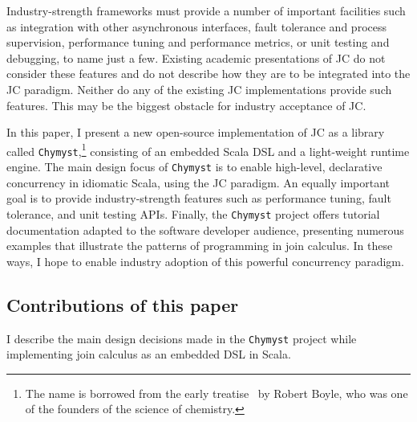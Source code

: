 \documentclass[sigplan,10pt,review,anonymous]{acmart}\settopmatter{printfolios=true}
\begin{document}
Industry-strength frameworks must provide a number of important facilities
such as integration with other asynchronous interfaces, fault tolerance
and process supervision, performance tuning and performance metrics,
or unit testing and debugging, to name just a few. Existing academic
presentations of JC do not consider these features and do not describe
how they are to be integrated into the JC paradigm. Neither do any
of the existing JC implementations provide such features. This may
be the biggest obstacle for industry acceptance of JC.

In this paper, I present a new open-source implementation of JC as
a library called \texttt{Chymyst},\footnote{ The name is borrowed from the early treatise~\citep{Boy1661} by
Robert Boyle, who was one of the founders of the science of chemistry.} consisting of an embedded Scala DSL and a light-weight runtime engine.
The main design focus of \texttt{Chymyst} is to enable high-level,
declarative concurrency in idiomatic Scala, using the JC paradigm.
An equally important goal is to provide industry-strength features
such as performance tuning, fault tolerance, and unit testing APIs.
Finally, the \texttt{Chymyst} project offers tutorial documentation
adapted to the software developer audience, presenting numerous examples
that illustrate the patterns of programming in join calculus. In these
ways, I hope to enable industry adoption of this powerful concurrency
paradigm.

\subsection{Contributions of this paper}

I describe the main design decisions made in the \texttt{Chymyst}
project while implementing join calculus as an embedded DSL in Scala. 
\end{document}
